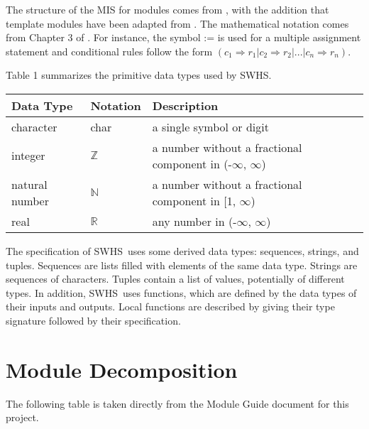 \documentclass[12pt, titlepage]{article}
\newcommand{\progname}{SWHS}
\begin{document}
The structure of the MIS for modules comes from \citet{HoffmanAndStrooper1995},
with the addition that template modules have been adapted from
\cite{GhezziEtAl2003}.  The mathematical notation comes from Chapter 3 of
\citet{HoffmanAndStrooper1995}.  For instance, the symbol := is used for a
multiple assignment statement and conditional rules follow the form $(c_1
\Rightarrow r_1 | c_2 \Rightarrow r_2 | ... | c_n \Rightarrow r_n )$.

Table 1 summarizes the primitive data types used by \progname. 

\begin{center}
\renewcommand{\arraystretch}{1.2}
\noindent 
\begin{tabular}{l l p{7.5cm}} 
\toprule 
\textbf{Data Type} & \textbf{Notation} & \textbf{Description}\\ 
\midrule
character & char & a single symbol or digit\\
integer & $\mathbb{Z}$ & a number without a fractional component in (-$\infty$, $\infty$) \\
natural number & $\mathbb{N}$ & a number without a fractional component in [1, $\infty$) \\
real & $\mathbb{R}$ & any number in (-$\infty$, $\infty$)\\
\bottomrule
\end{tabular} 
\end{center}

\noindent
The specification of \progname \ uses some derived data types: sequences, strings, and
tuples. Sequences are lists filled with elements of the same data type. Strings
are sequences of characters. Tuples contain a list of values, potentially of
different types. In addition, \progname \ uses functions, which
are defined by the data types of their inputs and outputs. Local functions are
described by giving their type signature followed by their specification.

\section{Module Decomposition}

The following table is taken directly from the Module Guide document for this project.
\end{document}
